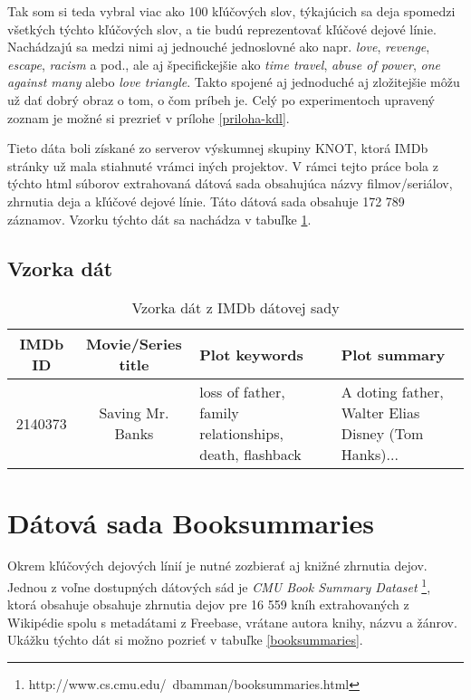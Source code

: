 Tak som si teda vybral viac ako 100 kľúčových slov, týkajúcich sa deja spomedzi všetkých týchto kľúčových slov, a tie budú reprezentovať kľúčové dejové línie. Nachádzajú sa medzi nimi aj jednouché jednoslovné ako napr. \textit{love}, \textit{revenge}, \textit{escape}, \textit{racism} a pod., ale aj špecifickejšie ako \textit{time travel}, \textit{abuse of power}, \textit{one against many} alebo \textit{love triangle}. Takto spojené aj jednoduché aj zložitejšie môžu už dať dobrý obraz o tom, o čom príbeh je. Celý po experimentoch upravený zoznam je možné si prezrieť v prílohe \ref{priloha-kdl}. 

Tieto dáta boli získané zo serverov výskumnej skupiny KNOT, ktorá IMDb stránky už mala stiahnuté vrámci iných projektov. V rámci tejto práce bola z týchto html súborov extrahovaná dátová sada obsahujúca názvy filmov/seriálov, zhrnutia deja a kľúčové dejové línie. Táto dátová sada obsahuje 172 789 záznamov. Vzorku týchto dát sa nachádza v tabuľke \ref{imdb}.

\subsection*{Vzorka dát}

\begin{table}[hbt]
\centering
\caption{Vzorka dát z IMDb dátovej sady}
\label{imdb}
\begin{tabular}{|c|c|
>{\centering\arraybackslash}m{7em}|
>{\centering\arraybackslash}m{7em}|}
\hline
IMDb ID & Movie/Series title & Plot keywords & Plot summary \\
\hline
2140373 & Saving Mr. Banks & loss of father, family relationships, death, flashback &  A doting father, Walter Elias Disney (Tom Hanks)...\\ 
\hline

\end{tabular}
\end{table}

\section{Dátová sada Booksummaries}
Okrem kľúčových dejových línií je nutné zozbierať aj knižné zhrnutia dejov. Jednou z voľne dostupných dátových sád je \textit{CMU Book Summary Dataset} \footnote{http://www.cs.cmu.edu/~dbamman/booksummaries.html}, ktorá obsahuje obsahuje zhrnutia dejov pre 16 559 kníh extrahovaných z Wikipédie spolu s metadátami z Freebase, vrátane autora knihy, názvu a žánrov. Ukážku týchto dát si možno pozrieť v tabuľke \ref{booksummaries}.

